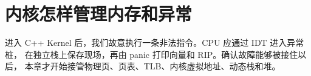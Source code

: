 \chapter{内核怎样管理内存和异常}

进入 C++ Kernel 后，我们故意执行一条非法指令。CPU 应通过 IDT 进入异常桩，
在独立栈上保存现场，再由 panic 打印向量和 RIP。确认故障能够被接住以后，
本章才开始接管物理页、页表、TLB、内核虚拟地址、动态栈和堆。



